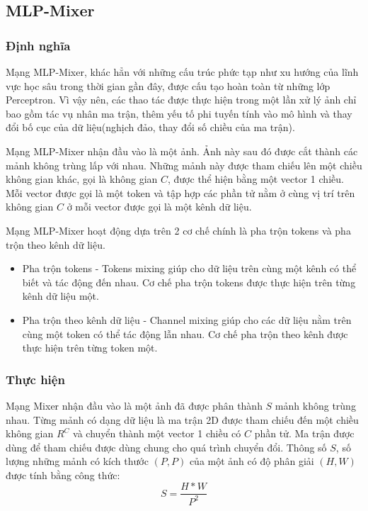 \subsection{MLP-Mixer}
\subsubsection*{Định nghĩa}
Mạng MLP-Mixer, khác hẳn với những cấu trúc phức tạp như xu hướng của lĩnh vực học sâu trong thời gian gần đây, được cấu tạo hoàn toàn từ những lớp Perceptron. Vì vậy nên, các thao tác được thực hiện trong một lần xử lý ảnh chỉ bao gồm tác vụ nhân ma trận, thêm yếu tố phi tuyến tính vào mô hình và thay đổi bố cục của dữ liệu(nghịch đảo, thay đổi số chiều của ma trận).

Mạng MLP-Mixer nhận đầu vào là một ảnh. Ảnh này sau đó được cắt thành các mảnh không trùng lấp với nhau. Những mảnh này được tham chiếu lên một chiều không gian khác, gọi là không gian $C$, được thể hiện bằng một vector 1 chiều. Mỗi vector được gọi là một token và tập hợp các phần tử nằm ở cùng vị trí trên không gian $C$ ở mỗi vector được gọi là một kênh dữ liệu.

Mạng MLP-Mixer hoạt động dựa trên 2 cơ chế chính là pha trộn tokens và pha trộn theo kênh dữ liệu.
\begin{itemize}
    \item Pha trộn tokens - Tokens mixing giúp cho dữ liệu trên cùng một kênh có thể biết và tác động đến nhau. Cơ chế pha trộn tokens được thực hiện trên từng kênh dữ liệu một.
    \item Pha trộn theo kênh dữ liệu - Channel mixing giúp cho các dữ liệu nằm trên cùng một token có thể tác động lẫn nhau. Cơ chế pha trộn theo kênh được thực hiện trên từng token một.
\end{itemize}

\subsubsection*{Thực hiện}
Mạng Mixer nhận đầu vào là một ảnh đã được phân thành $S$ mảnh không trùng nhau. Từng mảnh có dạng dữ liệu là ma trận 2D được tham chiếu đến một chiều không gian $R^{C}$ và chuyển thành một vector 1 chiều có $C$ phần tử. Ma trận được dùng để tham chiếu được dùng chung cho quá trình chuyển đổi. Thông số $S$, số lượng những mảnh có kích thước $(P,P)$ của một ảnh có độ phân giải $(H,W)$ được tính bằng công thức:
\begin{equation}
    S = \frac{H*W}{P^{2}}
\end{equation}

